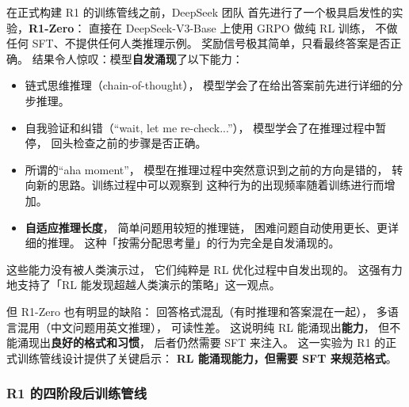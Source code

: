 在正式构建 R1 的训练管线之前，DeepSeek 团队
首先进行了一个极具启发性的实验，\textbf{R1-Zero}：
直接在 DeepSeek-V3-Base 上使用 GRPO 做纯 RL 训练，
不做任何 SFT、不提供任何人类推理示例。
奖励信号极其简单，只看最终答案是否正确。
结果令人惊叹：模型\textbf{自发涌现}了以下能力：
\begin{itemize}[noitemsep]
  \item 链式思维推理（chain-of-thought），
        模型学会了在给出答案前先进行详细的分步推理。
  \item 自我验证和纠错（“wait, let me re-check...”），
        模型学会了在推理过程中暂停，
        回头检查之前的步骤是否正确。
  \item 所谓的“aha moment”，
        模型在推理过程中突然意识到之前的方向是错的，
        转向新的思路。训练过程中可以观察到
        这种行为的出现频率随着训练进行而增加。
  \item \textbf{自适应推理长度}，
        简单问题用较短的推理链，
        困难问题自动使用更长、更详细的推理。
        这种「按需分配思考量」的行为完全是自发涌现的。
\end{itemize}

这些能力没有被人类演示过，
它们纯粹是 RL 优化过程中自发出现的。
这强有力地支持了「RL 能发现超越人类演示的策略」这一观点。

但 R1-Zero 也有明显的缺陷：
回答格式混乱（有时推理和答案混在一起），
多语言混用（中文问题用英文推理），
可读性差。
这说明纯 RL 能涌现出\textbf{能力}，
但不能涌现出\textbf{良好的格式和习惯}，
后者仍然需要 SFT 来注入。
这一实验为 R1 的正式训练管线设计提供了关键启示：
\textbf{RL 能涌现能力，但需要 SFT 来规范格式}。

\subsubsection{R1 的四阶段后训练管线}

